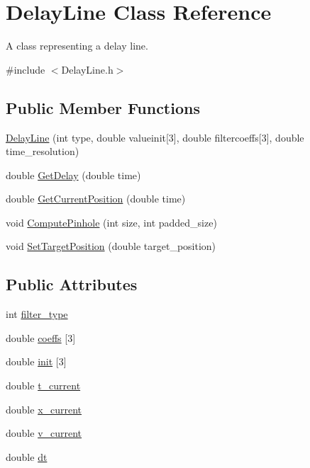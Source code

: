 \hypertarget{classDelayLine}{
\section{DelayLine Class Reference}
\label{classDelayLine}
}


A class representing a delay line.  




{\ttfamily \#include $<$DelayLine.h$>$}

\subsection*{Public Member Functions}
\begin{DoxyCompactItemize}
\item 
\hyperlink{classDelayLine_aae3ff3e21f8887d0df1948e13c093b90}{DelayLine} (int type, double valueinit\mbox{[}3\mbox{]}, double filtercoeffs\mbox{[}3\mbox{]}, double time\_\-resolution)
\item 
double \hyperlink{classDelayLine_af03fce4b30c09428624fcf27bb6d8476}{GetDelay} (double time)
\item 
double \hyperlink{classDelayLine_a230dfa049c8b66e41e028c15b63d23fa}{GetCurrentPosition} (double time)
\item 
void \hyperlink{classDelayLine_aa11d93779cebcc3a57b920a5fcbda891}{ComputePinhole} (int size, int padded\_\-size)
\item 
void \hyperlink{classDelayLine_aaea9efb6c8a6e791ac75f9bac6c4fe8e}{SetTargetPosition} (double target\_\-position)
\end{DoxyCompactItemize}
\subsection*{Public Attributes}
\begin{DoxyCompactItemize}
\item 
int \hyperlink{classDelayLine_a86b4adda2792d346ee78b59a3e26992a}{filter\_\-type}
\item 
double \hyperlink{classDelayLine_a55d069a045ac765d5783f41a2348fdd4}{coeffs} \mbox{[}3\mbox{]}
\item 
double \hyperlink{classDelayLine_a998ede89f80499652d8f1da052fc90de}{init} \mbox{[}3\mbox{]}
\item 
double \hyperlink{classDelayLine_ae46cf8249f9040270c5ffb1289e5f760}{t\_\-current}
\item 
double \hyperlink{classDelayLine_a36cd2a92c561630bbaa6646f23a00626}{x\_\-current}
\item 
double \hyperlink{classDelayLine_a4d51575ded15097f1a837d3ceeaf6bec}{v\_\-current}
\item 
double \hyperlink{classDelayLine_a4086dcba3b4835c3a1f2072768e6b8c2}{dt}
\end{DoxyCompactItemize}


